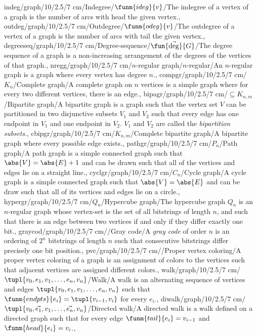 indeg/graph/10/2.5/7 cm/{Indegree}/{$\funm{ideg}{v}$}/{The indegree of a vertex of a graph is the number of arcs with head the given vertex.},
outdeg/graph/10/2.5/7 cm/{Outdegree}/{$\funm{odeg}{v}$}/{The outdegree of a vertex of a graph is the number of arcs with tail the given vertex.},
degreeseq/graph/10/2.5/7 cm/{Degree-sequence}/{$\fun{\vec{\mbox{deg}}}{G}$}/{The degree sequence of a graph is a non-increasing arrangement of the degrees of the vertices of that graph.},
nregg/graph/10/2.5/7 cm/{$n$-regular graph}/{$n$-regular}/{An $n$-regular graph is a graph where every vertex has degree $n$.},
compgr/graph/10/2.5/7 cm/{$K_n$}/{Complete graph}/{A complete graph on $n$ vertices is a simple graph where for every two different vertices, there is an edge.},
bipagr/graph/10/2.5/7 cm/{$\subseteq K_{n,m}$}/{Bipartite graph}/{A bipartite graph is a graph such that the vertex set $V$ can be partitioned in two disjunctive subsets $V_1$ and $V_2$ such that every edge has one endpoint in $V_1$ and one endpoint in $V_2$. $V_1$ and $V_2$ are called the \emph{bipartition subsets}.},
cbipgr/graph/10/2.5/7 cm/{$K_{n,m}$}/{Complete bipartite graph}/{A bipartite graph where every possible edge exists.},
pathgr/graph/10/2.5/7 cm/{$P_n$}/{Path graph}/{A path graph is a simple connected graph such that $\abs{V}=\abs{E}+1$ and can be drawn such that all of the vertices and edges lie on a straight line.},
cyclgr/graph/10/2.5/7 cm/{$C_n$}/{Cycle graph}/{A cycle graph is a simple connected graph such that $\abs{V}=\abs{E}$ and can be draw such that all of its vertices and edges lie on a circle.},
hypergr/graph/10/2.5/7 cm/{$Q_n$}/{Hypercube graph}/{The hypercube graph $Q_n$ is an $n$-regular graph whose vertex-set is the set of all bitstrings of length $n$, and such that there is an edge between two vertices if and only if they differ exactly one bit.},
graycod/graph/10/2.5/7 cm/{}/{Gray code}/{A \emph{gray code} of order $n$ is an ordering of $2^n$ bitstrings of length $n$ such that consecutive bitstrings differ precisely one bit position.},
pvc/graph/10/2.5/7 cm/{}/{Proper vertex coloring}/{A proper vertex coloring of a graph is an assignment of colors to the vertices such that adjacent vertices are assigned different colors.},
walk/graph/10/2.5/7 cm/{$\tupl{v_0,e_1,v_1,\ldots,e_n,v_n}$}/{Walk}/{A walk is an alternating sequence of vertices and edges $\tupl{v_0,e_1,v_1,\ldots,e_n,v_n}$ such that $\funm{endpts}{e_i}=\tupl{v_{i-1},v_i}$ for every $e_i$.},
diwalk/graph/10/2.5/7 cm/{$\tupl{v_0,\vec{e_1},v_1,\ldots,\vec{e_n},v_n}$}/{Directed walk}/{A directed walk is a walk defined on a directed graph such that for every edge $\funm{tail}{e_i}=v_{i-1}$ and $\funm{head}{e_i}=v_i$.},
